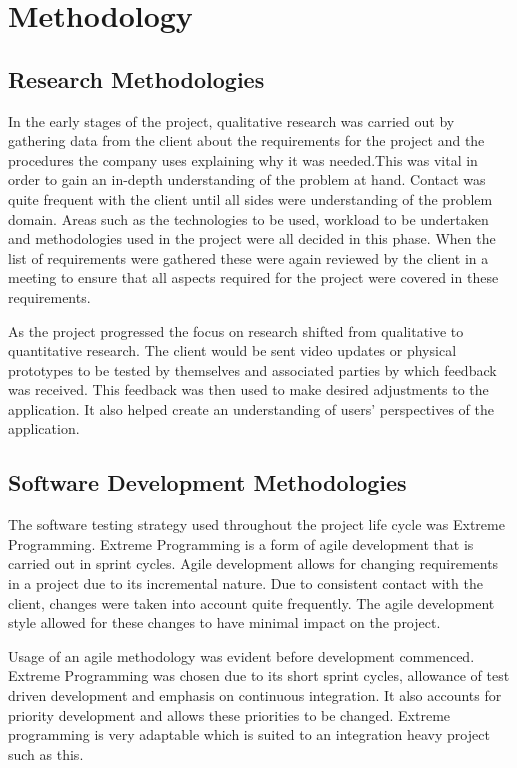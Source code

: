 \chapter{Methodology}

\section{Research Methodologies}
In the early stages of the project, qualitative research was carried out by gathering data from the client about the requirements for the project and the procedures the company uses explaining why it was needed.This was vital in order to gain an in-depth understanding of the problem at hand. Contact was quite frequent with the client until all sides were understanding of the problem domain. Areas such as the technologies to be used, workload to be undertaken and methodologies used in the project were all decided in this phase. When the list of requirements were gathered these were again reviewed by the client in a meeting to ensure that all aspects required for the project were covered in these requirements.\par
As the project progressed the focus on research shifted from qualitative to quantitative research. The client would be sent video updates or physical prototypes to be tested by themselves and associated parties by which feedback was received. This feedback was then used to make desired adjustments to the application. It also helped create an understanding of users' perspectives of the application.
\newpage

\section{Software Development Methodologies}
The software testing strategy used throughout the project life cycle was Extreme Programming. Extreme Programming is a form of agile development that is carried out in sprint cycles. Agile development allows for changing requirements in a project due to its incremental nature. Due to consistent contact with the client, changes were taken into account quite frequently. The agile development style allowed for these changes to have minimal impact on the project.\par
Usage of an agile methodology was evident before development commenced. Extreme Programming was chosen due to its short sprint cycles, allowance of test driven development and emphasis on continuous integration. It also accounts for priority development and allows these priorities to be changed. Extreme programming is very adaptable which is suited to an integration heavy project such as this.

